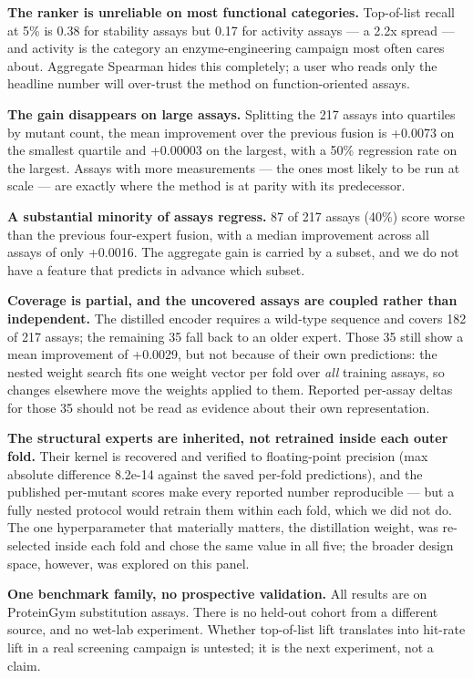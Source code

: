 \documentclass[sigconf,review,nonacm]{acmart}
\begin{document}
\textbf{The ranker is unreliable on most functional categories.} Top-of-list recall at 5\% is 0.38 for
stability assays but 0.17 for activity assays --- a 2.2x spread --- and activity is the category an
enzyme-engineering campaign most often cares about. Aggregate Spearman hides this completely; a user
who reads only the headline number will over-trust the method on function-oriented assays.

\textbf{The gain disappears on large assays.} Splitting the 217 assays into quartiles by mutant count, the
mean improvement over the previous fusion is +0.0073 on the smallest quartile and +0.00003 on the
largest, with a 50\% regression rate on the largest. Assays with more measurements --- the ones most
likely to be run at scale --- are exactly where the method is at parity with its predecessor.

\textbf{A substantial minority of assays regress.} 87 of 217 assays (40\%) score worse than the previous
four-expert fusion, with a median improvement across all assays of only +0.0016. The aggregate gain is
carried by a subset, and we do not have a feature that predicts in advance which subset.

\textbf{Coverage is partial, and the uncovered assays are coupled rather than independent.} The distilled
encoder requires a wild-type sequence and covers 182 of 217 assays; the remaining 35 fall back to an
older expert. Those 35 still show a mean improvement of +0.0029, but not because of their own
predictions: the nested weight search fits one weight vector per fold over \emph{all} training assays, so
changes elsewhere move the weights applied to them. Reported per-assay deltas for those 35 should not
be read as evidence about their own representation.

\textbf{The structural experts are inherited, not retrained inside each outer fold.} Their kernel is
recovered and verified to floating-point precision (max absolute difference 8.2e-14 against the saved
per-fold predictions), and the published per-mutant scores make every reported number reproducible ---
but a fully nested protocol would retrain them within each fold, which we did not do. The one
hyperparameter that materially matters, the distillation weight, was re-selected inside each fold and
chose the same value in all five; the broader design space, however, was explored on this panel.

\textbf{One benchmark family, no prospective validation.} All results are on ProteinGym substitution
assays. There is no held-out cohort from a different source, and no wet-lab experiment. Whether
top-of-list lift translates into hit-rate lift in a real screening campaign is untested; it is the
next experiment, not a claim.
\end{document}
